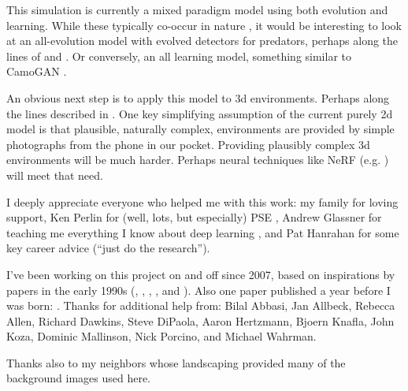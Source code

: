 \documentclass[acmtog,
    anonymous,
    review
    ]{acmart}
\begin{document}
\par
This simulation is currently a mixed paradigm model using both evolution and learning. While these typically co-occur in nature \cite{valiant_probably_2013}, it would be interesting to look at an all-evolution model with evolved detectors for predators, perhaps along the lines of \citet{harrington_coevolution_2014} and \citet{bi_genetic_2022}. Or conversely, an all learning model, something similar to CamoGAN \cite{talas_camogan_2020}.
\par
An obvious next step is to apply this model to 3d environments. Perhaps along the lines described in \citet{miller_color_2022}. One key simplifying assumption of the current purely 2d model is that plausible, naturally complex, environments are provided by simple photographs from the phone in our pocket. Providing plausibly complex 3d environments will be much harder. Perhaps neural techniques like NeRF (e.g. \cite{gao_nerf_2022}) will meet that need.
\par


\begin{acks}
I deeply appreciate everyone who helped me with this work: my family for loving support, Ken Perlin for (well, lots, but especially) PSE \cite{perlin_image_1985}, Andrew Glassner for teaching me everything I know about deep learning \cite{glassner_deep_2021}, and Pat Hanrahan for some key career advice (“just do the research”).
\par
I've been working on this project on and off since 2007, based on inspirations by papers in the early 1990s (\citet{witkin_reaction_1991}, \citet{turk_generating_1991}, \citet{angeline_competitive_1993}, \citet{sims_artificial_1991}, and \citet{sims_evolving_1994}). Also one paper published a year before I was born: \citet{turing_chemical_1952}.
Thanks for additional help from:
Bilal Abbasi,
Jan Allbeck,
Rebecca Allen,
Richard Dawkins,
Steve DiPaola,
Aaron Hertzmann,
Bjoern Knafla,
John Koza,
Dominic Mallinson,
Nick Porcino,
and Michael Wahrman.
\par
Thanks also to my neighbors whose landscaping provided many of the background images used here.
\par
\end{acks}


\newpage


\end{document}
